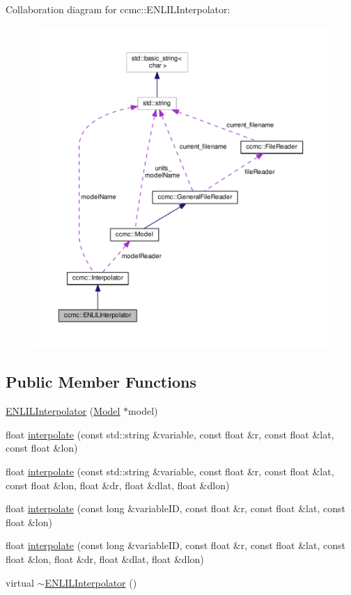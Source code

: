 Collaboration diagram for ccmc\-:\-:E\-N\-L\-I\-L\-Interpolator\-:
\nopagebreak
\begin{figure}[H]
\begin{center}
\leavevmode
\includegraphics[width=350pt]{classccmc_1_1_e_n_l_i_l_interpolator__coll__graph}
\end{center}
\end{figure}
\subsection*{Public Member Functions}
\begin{DoxyCompactItemize}
\item 
\hyperlink{classccmc_1_1_e_n_l_i_l_interpolator_a923bb213a4816f5fd5d6dac6014061dd}{E\-N\-L\-I\-L\-Interpolator} (\hyperlink{classccmc_1_1_model}{Model} $\ast$model)
\item 
float \hyperlink{classccmc_1_1_e_n_l_i_l_interpolator_a6723169457825345162aa4a3af57841b}{interpolate} (const std\-::string \&variable, const float \&r, const float \&lat, const float \&lon)
\item 
float \hyperlink{classccmc_1_1_e_n_l_i_l_interpolator_ac786bd26509226558bc5c1147aef830b}{interpolate} (const std\-::string \&variable, const float \&r, const float \&lat, const float \&lon, float \&dr, float \&dlat, float \&dlon)
\item 
float \hyperlink{classccmc_1_1_e_n_l_i_l_interpolator_a57c5c56a524e42db6e0146fb0c9c8ae8}{interpolate} (const long \&variable\-I\-D, const float \&r, const float \&lat, const float \&lon)
\item 
float \hyperlink{classccmc_1_1_e_n_l_i_l_interpolator_a92508c6305deec651299b7e70ee3c531}{interpolate} (const long \&variable\-I\-D, const float \&r, const float \&lat, const float \&lon, float \&dr, float \&dlat, float \&dlon)
\item 
virtual \hyperlink{classccmc_1_1_e_n_l_i_l_interpolator_afb3fe1955829bc6c5aeda4ca22e5f5b9}{$\sim$\-E\-N\-L\-I\-L\-Interpolator} ()
\end{DoxyCompactItemize}
